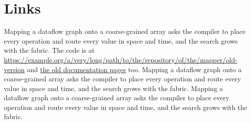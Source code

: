 \documentclass[twocolumn]{article}
\begin{document}
\section{Links}
Mapping a dataflow graph onto a coarse-grained array asks the compiler to place every operation and route every value in space and time, and the search grows with the fabric. The code is at \url{https://example.org/a/very/long/path/to/the/repository/of/the/mapper/old-version} and \href{https://example.org/docs}{the old documentation pages} too. Mapping a dataflow graph onto a coarse-grained array asks the compiler to place every operation and route every value in space and time, and the search grows with the fabric. Mapping a dataflow graph onto a coarse-grained array asks the compiler to place every operation and route every value in space and time, and the search grows with the fabric.
\end{document}

